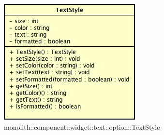 \label{monolith::component::widget::text::option::TextStyle}
\begin{figure}[ht]
	\centering
	\includegraphics[scale=0.5]{Sezioni/SottosezioniST/img/TextStyle.png}
	\caption{monolith::component::widget::text::option::TextStyle}
\end{figure}

